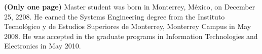 \textbf{(Only one page)} Master student was born in Monterrey, M\'{e}xico, on December 25, 2208. He earned the Systems Engineering degree from the Instituto Tecnológico y de Estudios Superiores de Monterrey, Monterrey Campus in May 2008. He was accepted in the graduate programs in Information Technologies and Electronics in May 2010.
